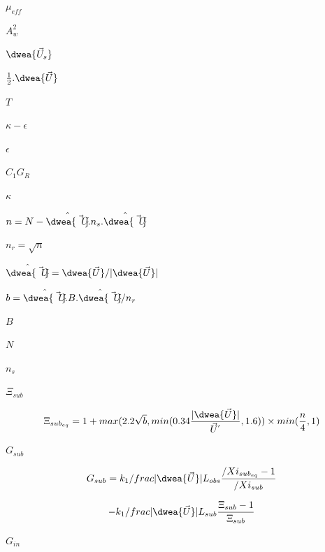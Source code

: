 \documentclass{article}
\begin{document}
$ \mu_{eff} $
\pagebreak

$ A_{w}^{2}$
\pagebreak

$ \dwea{\vec{U}_{s}} $
\pagebreak

$ \frac{1}{2}. \dwea{\vec{U}} $
\pagebreak

$ T $
\pagebreak

$ \kappa-\epsilon
$
\pagebreak

$ \epsilon  $
\pagebreak

$ C_{1} G_{R} $
\pagebreak

$ \kappa $
\pagebreak

$ n = N - \hat{\dwea{\vec{U}}}.n_{s}.\hat{\dwea{\vec{U}}} $
\pagebreak

$ n_{r} = \sqrt{n} $
\pagebreak

$ \hat{\dwea{\vec{U}}} = \dwea{\vec{U}} / \vert \dwea{\vec{U}}
    \vert $
\pagebreak

$ b = \hat{\dwea{\vec{U}}}.B.\hat{\dwea{\vec{U}}} / n_{r} $
\pagebreak

$ B $
\pagebreak

$ N $
\pagebreak

$  n_{s} $
\pagebreak

$ \Xi_{sub} $
\pagebreak

\[
    \Xi_{{sub}_{eq}} =
        1 + max(2.2 \sqrt{b}, min(0.34 \frac{\vert \dwea{\vec{U}}
        \vert}{{\vec{U}}^{'}}, 1.6)) \times min(\frac{n}{4}, 1)
\]
\pagebreak

$ G_{sub} $
\pagebreak

\[
    G_{sub} = k_{1} /frac{\vert \dwea{\vec{U}} \vert}{L_{obs}}
             \frac{/Xi_{{sub}_{eq}}-1}{/Xi_{sub}}
\]
\pagebreak

\[
    - k_{1} /frac{\vert \dwea{\vec{U}} \vert}{L_{sub}}
    \frac{\Xi_{sub}-1}{\Xi_{sub}}
\]
\pagebreak

$ G_{in} $
\pagebreak
\end{document}
